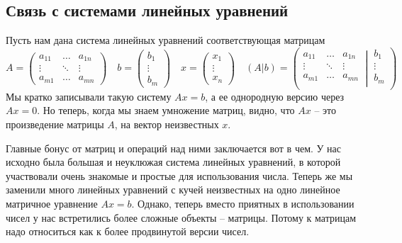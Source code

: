 \subsection{Связь с системами линейных уравнений}

Пусть нам дана система линейных уравнений соответствующая матрицам
\[
A= 
\begin{pmatrix}
a_{11}&\ldots& a_{1n}\\
\vdots&\ddots&\vdots\\
a_{m1}& \ldots &a_{mn}
\end{pmatrix}\quad
b = 
\begin{pmatrix}
b_1\\
\vdots\\
b_m
\end{pmatrix} \quad
x =
\begin{pmatrix}
x_1\\
\vdots\\
x_n
\end{pmatrix}\quad
(A|b) =
\left(\left.
\begin{matrix}
a_{11}&\ldots&a_{1n}\\
\vdots&\ddots&\vdots\\
a_{m1}&\ldots&a_{mn}\\
\end{matrix}
\:\right|\:
\begin{matrix}
b_1\\
\vdots\\
b_m\\
\end{matrix}\right)
\]
Мы кратко записывали такую систему $Ax = b$, а ее однородную версию через $Ax = 0$.
Но теперь, когда мы знаем умножение матриц, видно, что $Ax$ -- это произведение матрицы $A$, на вектор неизвестных $x$.

Главные бонус от матриц и операций над ними заключается вот в чем.
У нас исходно была большая и неуклюжая система линейных уравнений, в которой участвовали очень знакомые и простые для использования числа.
Теперь же мы заменили много линейных уравнений с кучей неизвестных на одно линейное матричное уравнение $Ax = b$.
Однако, теперь вместо приятных в использовании чисел у нас встретились более сложные объекты -- матрицы.
Потому к матрицам надо относиться как к более продвинутой версии чисел.


